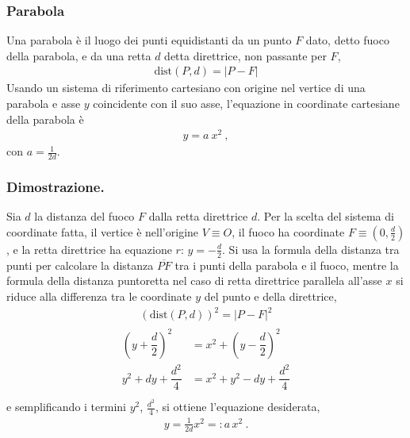 \documentclass[letterpaper,10pt,english]{jupyterBook}
\begin{document}
\subsubsection{Parabola}
\label{\detokenize{ch/analytic_geometry/analytic_geometry_2d/conics-cartesian:parabola}}
\sphinxAtStartPar
Una parabola è il luogo dei punti equidistanti da un punto \(F\) dato, detto fuoco della parabola, e da una retta \(d\) detta direttrice, non passante per \(F\),
\begin{equation*}
\begin{split}\text{dist}(P,d) = |P - F|\end{split}
\end{equation*}
\sphinxAtStartPar
Usando un sistema di riferimento cartesiano con origine nel vertice di una parabola e asse \(y\) coincidente con il suo asse, l’equazione in coordinate cartesiane della parabola è
\begin{equation*}
\begin{split}y = a \ x^2 \ ,\end{split}
\end{equation*}
\sphinxAtStartPar
con \(a = \frac{1}{2 d}\).
\subsubsection*{Dimostrazione.}

\sphinxAtStartPar
{}
Sia \(d\) la distanza del fuoco \(F\) dalla retta direttrice \(d\). Per la scelta del sistema di coordinate fatta, il vertice è nell’origine \(V \equiv O\), il fuoco ha coordinate \(F \equiv \left(0, \frac{d}{2} \right)\), e la retta direttrice ha equazione \(r: \, y = - \frac{d}{2}\).
Si usa la formula della distanza tra punti per calcolare la distanza \(\overline{PF}\) tra i punti della parabola e il fuoco, mentre la formula della distanza punto\sphinxhyphen{}retta nel caso di retta direttrice parallela all’asse \(x\) si riduce alla differenza tra le coordinate \(y\) del punto e della direttrice,
\begin{equation*}
\begin{split}\left( \text{dist}(P,d) \right)^2 = |P-F|^2\end{split}
\end{equation*}\begin{equation*}
\begin{split}\begin{aligned}
  \left(y+\dfrac{d}{2}\right)^2 & = x^2 + \left(y-\dfrac{d}{2}\right)^2 \\
  y^2 + d y + \dfrac{d^2}{4}    & = x^2 + y^2 - d y + \dfrac{d^2}{4}    \\
\end{aligned}\end{split}
\end{equation*}
\sphinxAtStartPar
e semplificando i termini \(y^2\), \(\frac{d^2}{4}\), si ottiene l’equazione desiderata,
\begin{equation*}
\begin{split}y = \frac{1}{2 d} x^2 =: a \, x^2 \ .\end{split}
\end{equation*}
\end{document}
